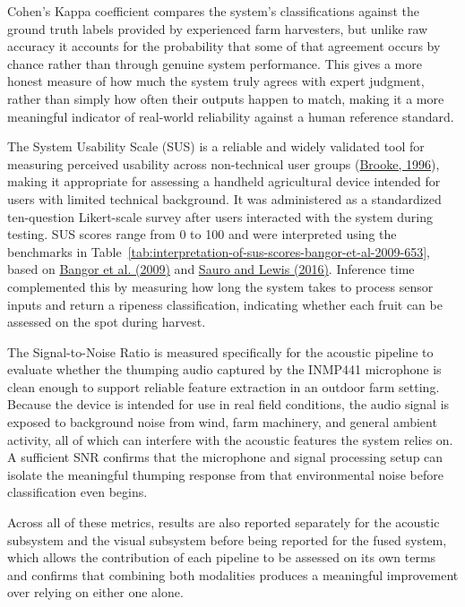 \begin{thesisprose}
Cohen's Kappa coefficient compares the system's classifications against the ground truth labels provided by experienced farm harvesters, but unlike raw accuracy it accounts for the probability that some of that agreement occurs by chance rather than through genuine system performance. This gives a more honest measure of how much the system truly agrees with expert judgment, rather than simply how often their outputs happen to match, making it a more meaningful indicator of real-world reliability against a human reference standard.

The System Usability Scale (SUS) is a reliable and widely validated tool for measuring perceived usability across non-technical user groups (\hyperlink{cite.brooke1996}{Brooke, 1996}), making it appropriate for assessing a handheld agricultural device intended for users with limited technical background. It was administered as a standardized ten-question Likert-scale survey after users interacted with the system during testing. SUS scores range from 0 to 100 and were interpreted using the benchmarks in Table~\ref{tab:interpretation-of-sus-scores-bangor-et-al-2009-653}, based on \hyperlink{cite.bangor2009}{Bangor et al. (2009)} and \hyperlink{cite.sauro2016}{Sauro and Lewis (2016)}. Inference time complemented this by measuring how long the system takes to process sensor inputs and return a ripeness classification, indicating whether each fruit can be assessed on the spot during harvest.

The Signal-to-Noise Ratio is measured specifically for the acoustic pipeline to evaluate whether the thumping audio captured by the INMP441 microphone is clean enough to support reliable feature extraction in an outdoor farm setting. Because the device is intended for use in real field conditions, the audio signal is exposed to background noise from wind, farm machinery, and general ambient activity, all of which can interfere with the acoustic features the system relies on. A sufficient SNR confirms that the microphone and signal processing setup can isolate the meaningful thumping response from that environmental noise before classification even begins.

Across all of these metrics, results are also reported separately for the acoustic subsystem and the visual subsystem before being reported for the fused system, which allows the contribution of each pipeline to be assessed on its own terms and confirms that combining both modalities produces a meaningful improvement over relying on either one alone.


\end{thesisprose}
